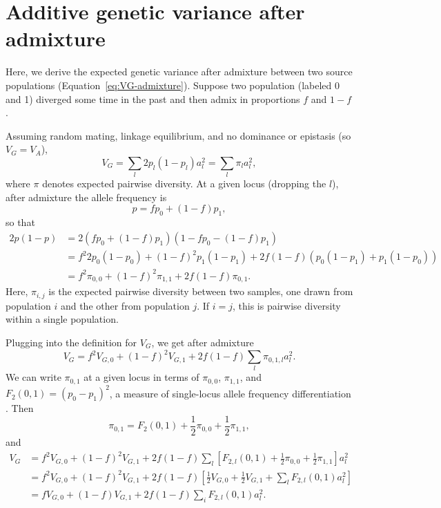 \documentclass[]{article}
\begin{document}
\section{Additive genetic variance after admixture}\label{sec:VG-admixture}

Here, we derive the expected genetic variance after admixture between two
source populations (Equation~\ref{eq:VG-admixture}). Suppose two population
(labeled 0 and 1) diverged some time in the past and then admix in proportions
$f$ and $1-f$.

Assuming random mating, linkage equilibrium, and no dominance or epistasis
(so \(V_G=V_A\)),
\[V_G = \sum_l 2p_l(1-p_l)a_l^2 = \sum_l \pi_l a_l^2,\]
where $\pi$ denotes expected pairwise diversity.
At a given locus (dropping the $l$), after admixture the allele frequency is
\[p=f p_0 + (1-f) p_1,\]
so that
\begin{align*}
    2p(1-p) & = 2(f p_0 + (1-f) p_1)(1 - f p_0 - (1-f) p_1) \\
    & = f^2 2p_0(1-p_0) + (1-f)^2 p_1(1-p_1) + 2f(1-f) (p_0(1-p_1) + p_1(1-p_0)) \\
    & = f^2 \pi_{0,0} + (1-f)^2 \pi_{1,1} + 2f(1-f)\pi_{0,1}.
\end{align*}
Here, $\pi_{i,j}$ is the expected pairwise diversity between two samples, one
drawn from population $i$ and the other from population $j$. If $i=j$, this is
pairwise diversity within a single population.

Plugging into the definition for $V_G$, we get after admixture
\[V_G = f^2 V_{G,0} + (1-f)^2 V_{G,1} + 2f(1-f)\sum_l \pi_{0,1,l}a_l^2.\]
We can write $\pi_{0,1}$ at a given locus in terms of $\pi_{0,0}$, $\pi_{1,1}$,
and $F_2(0,1)=(p_0-p_1)^2$, a measure of single-locus allele frequency
differentiation \citep{peter2016admixture}. Then
\[\pi_{0,1} = F_2(0,1) + \frac{1}{2}\pi_{0,0} + \frac{1}{2}\pi_{1,1},\]
and
\begin{align*}
    V_G & = f^2 V_{G,0} + (1-f)^2 V_{G,1} + 2f(1-f)\sum_l \left[F_{2,l}(0,1)
    + \frac{1}{2}\pi_{0,0} + \frac{1}{2}\pi_{1,1}\right] a_l^2 \\
    & = f^2 V_{G,0} + (1-f)^2 V_{G,1} + 2f(1-f)\left[\frac{1}{2}V_{G,0} 
    + \frac{1}{2}V_{G,1} + \sum_l F_{2,l}(0,1)a_l^2\right] \\
    & = f V_{G,0} + (1-f)V_{G,1} + 2f(1-f)\sum_i F_{2,l}(0,1)a_l^2.
\end{align*}
\end{document}
